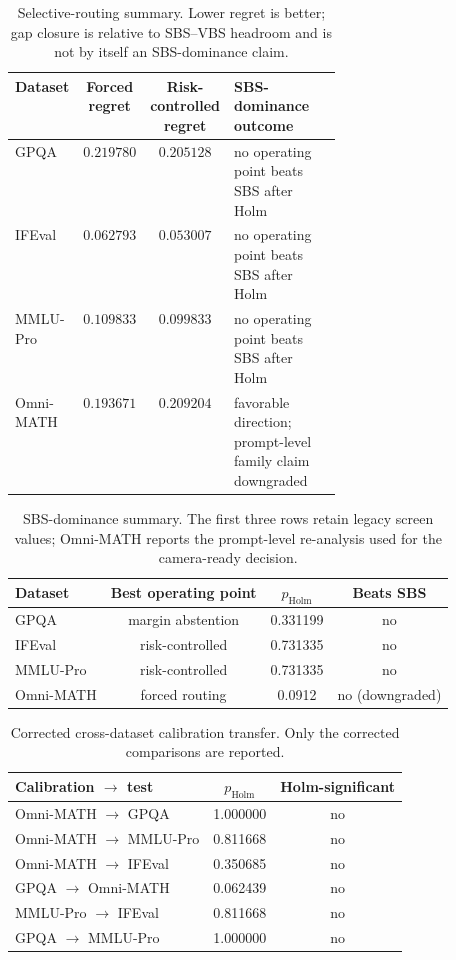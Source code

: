 \documentclass{article}
\newcommand{\sbs}{\textsc{SBS}}
\begin{document}
\begin{table}[h]
  \caption{Selective-routing summary. Lower regret is better; gap closure is relative to SBS--VBS headroom and is not by itself an SBS-dominance claim.}
  \label{tab:app-selective}
  \centering
  \scriptsize
  \begin{tabular}{lccp{0.38\linewidth}}
    \toprule
    Dataset & Forced regret & Risk-controlled regret & SBS-dominance outcome \\
    \midrule
    GPQA & $0.219780$ & $0.205128$ & no operating point beats SBS after Holm \\
    IFEval & $0.062793$ & $0.053007$ & no operating point beats SBS after Holm \\
    MMLU-Pro & $0.109833$ & $0.099833$ & no operating point beats SBS after Holm \\
    Omni-MATH & $0.193671$ & $0.209204$ & favorable direction; prompt-level family claim downgraded \\
    \bottomrule
  \end{tabular}
\end{table}

\begin{table}[h]
  \caption{SBS-dominance summary. The first three rows retain legacy screen values; Omni-MATH reports the prompt-level re-analysis used for the camera-ready decision.}
  \label{tab:app-sbs-dominance}
  \centering
  \scriptsize
  \begin{tabular}{lccc}
    \toprule
    Dataset & Best operating point & $p_{\text{Holm}}$ & Beats \sbs{} \\
    \midrule
    GPQA & margin abstention & 0.331199 & no \\
    IFEval & risk-controlled & 0.731335 & no \\
    MMLU-Pro & risk-controlled & 0.731335 & no \\
    Omni-MATH & forced routing & 0.0912 & no (downgraded) \\
    \bottomrule
  \end{tabular}
\end{table}

\begin{table}[h]
  \caption{Corrected cross-dataset calibration transfer. Only the corrected comparisons are reported.}
  \label{tab:app-cross-dataset}
  \centering
  \scriptsize
  \begin{tabular}{lcc}
    \toprule
    Calibration $\rightarrow$ test & $p_{\text{Holm}}$ & Holm-significant \\
    \midrule
    Omni-MATH $\rightarrow$ GPQA & 1.000000 & no \\
    Omni-MATH $\rightarrow$ MMLU-Pro & 0.811668 & no \\
    Omni-MATH $\rightarrow$ IFEval & 0.350685 & no \\
    GPQA $\rightarrow$ Omni-MATH & 0.062439 & no \\
    MMLU-Pro $\rightarrow$ IFEval & 0.811668 & no \\
    GPQA $\rightarrow$ MMLU-Pro & 1.000000 & no \\
    \bottomrule
  \end{tabular}
\end{table}
\end{document}
